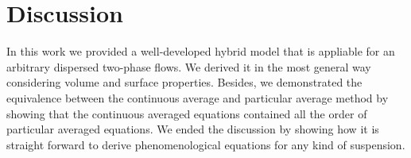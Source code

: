 \section{Discussion}

In this work we provided a well-developed hybrid model that is appliable for an arbitrary dispersed two-phase flows. 
We derived it in the most general way considering volume and surface properties. 
Besides, we demonstrated the equivalence between the continuous average and particular average method by showing that the continuous averaged equations contained all the order of particular averaged equations. 
We ended the discussion by showing how it is straight forward to derive phenomenological equations for any kind of suspension. 
